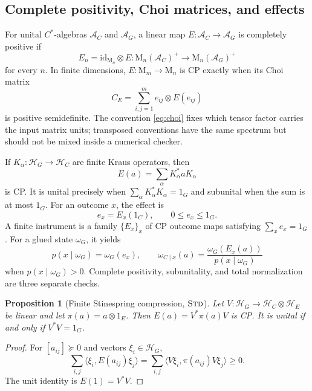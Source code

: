 \documentclass[11pt,a4paper]{article}
\newtheorem{proposition}[theorem]{Proposition}
\theoremstyle{definition}
\theoremstyle{remark}
\newcommand{\A}{\mathcal A}
\newcommand{\Hh}{\mathcal H}
\newcommand{\M}{\mathrm M}
\newcommand{\id}{\mathrm{id}}
\newcommand{\status}[1]{\textsc{#1}}
\begin{document}
\subsection{Complete positivity, Choi matrices, and effects}

For unital $C^*$-algebras $\A_C$ and $\A_G$, a linear map
$E:\A_C\rightarrow\A_G$ is completely positive if
\begin{equation}
  E_n=\id_{\M_n}\otimes E:
  \M_n(\A_C)^+\longrightarrow\M_n(\A_G)^+
  \label{eq:cpdef}
\end{equation}
for every $n$.  In finite dimensions, $E:\M_m\to\M_n$ is CP exactly when its Choi
matrix
\begin{equation}
  C_E=\sum_{i,j=1}^{m} e_{ij}\otimes E(e_{ij})
  \label{eq:choi}
\end{equation}
is positive semidefinite.  The convention \eqref{eq:choi} fixes which tensor factor
carries the input matrix units; transposed conventions have the same spectrum but
should not be mixed inside a numerical checker.

If $K_\alpha:\Hh_G\to\Hh_C$ are finite Kraus operators, then
\begin{equation}
  E(a)=\sum_\alpha K_\alpha^*aK_\alpha
  \label{eq:kraus}
\end{equation}
is CP.  It is unital precisely when
$\sum_\alpha K_\alpha^*K_\alpha=1_G$ and subunital when the sum is at most $1_G$.
For an outcome $x$, the effect is
\begin{equation}
  e_x=E_x(1_C),\qquad 0\leq e_x\leq1_G.
\end{equation}
A finite instrument is a family $\{E_x\}_x$ of CP outcome maps satisfying
$\sum_x e_x=1_G$.  For a glued state $\omega_G$, it yields
\begin{equation}
 p(x\mid\omega_G)=\omega_G(e_x),\qquad
 \omega_{C\mid x}(a)=\frac{\omega_G(E_x(a))}{p(x\mid\omega_G)}
 \label{eq:posterior}
\end{equation}
when $p(x\mid\omega_G)>0$.  Complete positivity, subunitality, and total normalization
are three separate checks.

\begin{proposition}[Finite Stinespring compression, $\status{Std}$]
Let $V:\Hh_G\to\Hh_C\otimes\Hh_E$ be linear and let
$\pi(a)=a\otimes1_E$.  Then $E(a)=V^*\pi(a)V$ is CP.  It is unital if and only if
$V^*V=1_G$.
\end{proposition}

\begin{proof}
For $[a_{ij}]\succeq0$ and vectors $\xi_i\in\Hh_G$,
\[
 \sum_{i,j}\langle\xi_i,E(a_{ij})\xi_j\rangle
 =\sum_{i,j}\langle V\xi_i,\pi(a_{ij})V\xi_j\rangle\geq0.
\]
The unit identity is $E(1)=V^*V$.
\end{proof}
\end{document}
